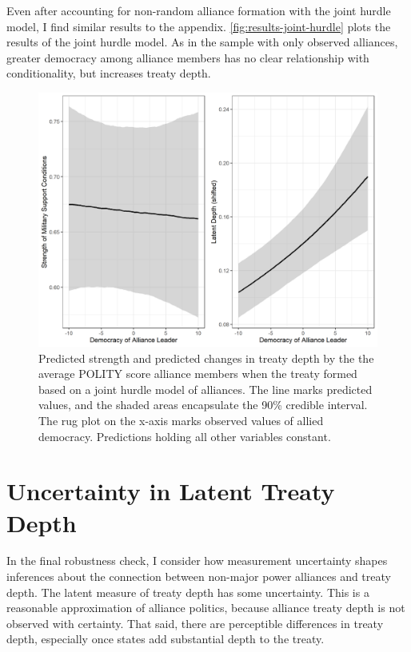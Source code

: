 \documentclass[12pt]{article}
\begin{document}
Even after accounting for non-random alliance formation with the joint hurdle model, I find similar results to the appendix. 
\autoref{fig:results-joint-hurdle} plots the results of the joint hurdle model. 
As in the sample with only observed alliances, greater democracy among alliance members has no clear relationship with conditionality, but increases treaty depth. 


\begin{figure}
\includegraphics[width=.95\textwidth]{results-joint-hurdle.png}  
\caption{Predicted strength and predicted changes in treaty depth by the the average POLITY score alliance members when the treaty formed based on a joint hurdle model of alliances. The line marks predicted values, and the shaded areas encapsulate the 90\% credible interval. The rug plot on the x-axis marks observed values of allied democracy. Predictions holding all other variables constant.}
\label{fig:results-joint-hurdle}
\end{figure}




\section{Uncertainty in Latent Treaty Depth} 


In the final robustness check, I consider how measurement uncertainty shapes inferences about the connection between non-major power alliances and treaty depth. 
The latent measure of treaty depth has some uncertainty. 
This is a reasonable approximation of alliance politics, because alliance treaty depth is not observed with certainty. 
That said, there are perceptible differences in treaty depth, especially once states add substantial depth to the treaty. 
\end{document}
